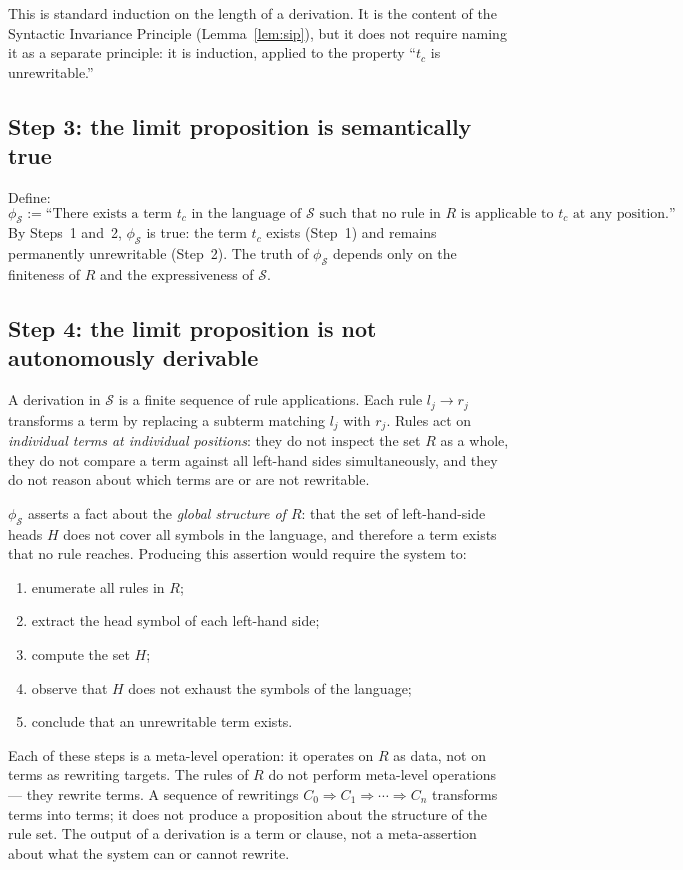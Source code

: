 \documentclass[11pt]{article}
\begin{document}
This is standard induction on the length of a derivation. It is the
content of the Syntactic Invariance Principle (Lemma~\ref{lem:sip}), but
it does not require naming it as a separate principle: it is induction,
applied to the property ``$t_c$ is unrewritable.''

\subsection{Step 3: the limit proposition is semantically true}

Define:
\[
  \phi_{\mathcal{S}} := \text{``There exists a term } t_c \text{ in the
  language of } \mathcal{S} \text{ such that no rule in } R \text{ is
  applicable to } t_c \text{ at any position.''}
\]
By Steps~1 and~2, $\phi_{\mathcal{S}}$ is true: the term $t_c$ exists
(Step~1) and remains permanently unrewritable (Step~2). The truth of
$\phi_{\mathcal{S}}$ depends only on the finiteness of $R$ and the
expressiveness of $\mathcal{S}$.

\subsection{Step 4: the limit proposition is not autonomously derivable}

A derivation in $\mathcal{S}$ is a finite sequence of rule applications.
Each rule $l_j \to r_j$ transforms a term by replacing a subterm
matching $l_j$ with $r_j$. Rules act on \emph{individual terms at
individual positions}: they do not inspect the set $R$ as a whole, they
do not compare a term against all left-hand sides simultaneously, and
they do not reason about which terms are or are not rewritable.

$\phi_{\mathcal{S}}$ asserts a fact about the \emph{global structure
of $R$}: that the set of left-hand-side heads $H$ does not cover all
symbols in the language, and therefore a term exists that no rule
reaches. Producing this assertion would require the system to:
\begin{enumerate}
  \item enumerate all rules in $R$;
  \item extract the head symbol of each left-hand side;
  \item compute the set $H$;
  \item observe that $H$ does not exhaust the symbols of the language;
  \item conclude that an unrewritable term exists.
\end{enumerate}
Each of these steps is a meta-level operation: it operates on $R$ as
data, not on terms as rewriting targets. The rules of $R$ do not perform
meta-level operations --- they rewrite terms. A sequence of rewritings
$C_0 \Rightarrow C_1 \Rightarrow \cdots \Rightarrow C_n$ transforms
terms into terms; it does not produce a proposition about the structure
of the rule set. The output of a derivation is a term or clause, not a
meta-assertion about what the system can or cannot rewrite.
\end{document}
